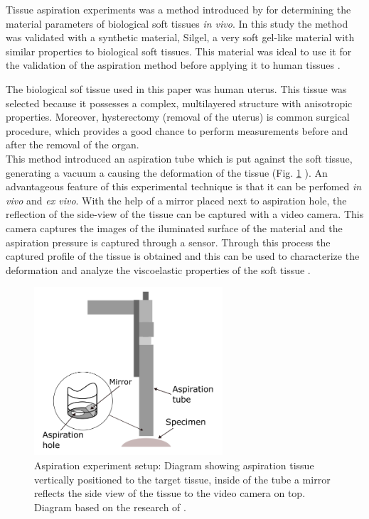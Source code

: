 Tissue aspiration experiments was a method introduced by \citet{Kauer2002} for determining 
the material parameters of biological soft tissues \textit{in vivo}.
In this study the method was validated with a synthetic material, Silgel, a very 
soft gel-like material with similar properties to biological soft tissues. 
This material was ideal to use it for the validation of the 
aspiration method before applying it to human tissues \cite{Kauer2002}.

The biological sof tissue used in this paper was human uterus. This tissue was selected 
because it possesses a complex, multilayered structure with anisotropic properties. 
Moreover, hysterectomy (removal of the uterus) is common surgical procedure, which 
provides a good chance to perform measurements before and after the removal of the organ.\\

This method introduced an aspiration tube which is put against the 
soft tissue, generating a vacuum a causing the deformation of the tissue (Fig. \ref{fig:aspiration} ). 
An advantageous feature of this experimental technique is that 
it can be perfomed \textit{in vivo} and \textit{ex vivo}.
With the help of a mirror placed next to aspiration hole, the reflection 
of the side-view of the tissue can be captured with a video camera.
This camera captures the images of the iluminated surface of the material and the 
aspiration pressure is captured through a sensor. Through this process the captured 
profile of the tissue is obtained and this can be used to characterize the deformation 
and analyze the viscoelastic properties of the soft tissue \cite{Kauer2002}.

\begin{figure}[th]
        \centering
        \includegraphics[width=7cm]{Images/chapter1/aspirationkauer.png}
        \caption[Aspiration experiment by \citet{Kauer2002}]{Aspiration experiment setup: Diagram showing aspiration tissue vertically positioned to the target tissue, inside of the tube a mirror reflects the side view of the tissue to the video camera on top. Diagram based on the research of \citet{Kauer2002}.}
        \label{fig:aspiration}
\end{figure}

